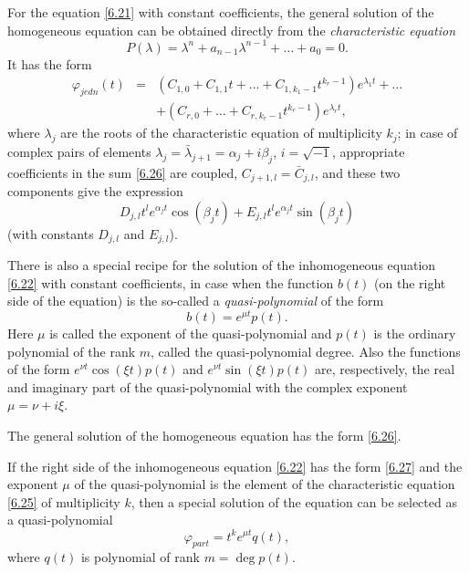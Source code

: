 For the equation \eqref{6.21} with constant coefficients, the general solution of the homogeneous equation can be obtained directly from the \emph{characteristic equation}
\begin{equation}
\label{6.25}
P(\lambda )=\lambda ^{n}+a_{n-1}\lambda ^{n-1}+\ldots +a_{0}=0.
\end{equation}
It has the form
\begin{equation}
\begin{array}{lll}
\varphi _{jedn}(t) & = & (C_{1,0}+C_{1,1}t+\ldots
+C_{1,k_{1}-1}t^{k_{r}-1})e^{\lambda _{1}t}+\ldots \\
&  & +(C_{r,0}+\ldots +C_{r,k_{r}-1}t^{k_{r}-1})e^{\lambda _{r}t},%
\end{array}
\label{6.26}
\end{equation}
where $\lambda _{j}$ are the roots of the characteristic equation of multiplicity $k_j$; in case of complex pairs of elements $\lambda _{j}=\bar{\lambda}_{j+1}=\alpha _{j}+i\beta _{j}$, $i=\sqrt{-1}$, appropriate coefficients in the sum \eqref{6.26} are coupled, $C_{j+1,l}=\bar{C}_{j,l}$, and these two components give the expression
$$
D_{j,l}t^{l}e^{\alpha _{j}t}\cos (\beta _{j}t)+E_{j,l}t^{l}e^{\alpha
	_{j}t}\sin (\beta _{j}t)
$$
(with constants $D_{j,l}$ and $E_{j,l}$).

There is also a special recipe for the solution of the inhomogeneous equation \eqref{6.22} with constant coefficients, in case when the function $b (t)$ (on the right side of the equation) is the so-called a \emph{quasi-polynomial} of the form
\begin{equation}
\label{6.27}
b(t)=e^{\mu t}p(t).
\end{equation}
Here $\mu$ is called the exponent of the quasi-polynomial and $p (t)$ is the ordinary polynomial of the rank $m$, called the quasi-polynomial degree. Also the functions of the form $e^{\nu t}\cos (\xi t)p(t)$ and $e^{\nu t}\sin
(\xi t)p(t)$ are, respectively, the real and imaginary part of the quasi-polynomial with the complex exponent $\mu =\nu +i\xi$.

\begin{theorem}
	The general solution of the homogeneous equation has the form \eqref{6.26}.
	
	If the right side of the inhomogeneous equation \eqref{6.22} has the form \eqref{6.27} and the exponent $\mu$ of the quasi-polynomial is the element of the characteristic equation \eqref{6.25} of multiplicity $k$, then a special solution of the equation can be selected as a quasi-polynomial
	$$
	\varphi _{part}=t^{k}e^{\mu t}q(t),
	$$
	where $q (t)$ is polynomial of  rank $m=\deg p(t)$.
\end{theorem}

